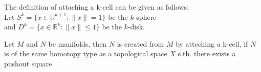 \documentclass{article}
\begin{document}
The definition of attaching a k-cell can be given as follows: \\
Let $S^k = \{x \in \mathbb{R}^{k+1} : \lVert x \rVert = 1\}$ be the $k$-sphere \\
and $D^k = \{ x \in \mathbb{R}^k : \lVert x \rVert \leq 1 \}$ be the $k$-disk.

Let $M$ and $N$ be manifolds, then $N$ is created from $M$ by atteching a k-cell,
if $N$ is of the same homotopy type as a topological space $X$ s.th. there exists 
a pushout square
\end{document}
